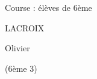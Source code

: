 \documentclass[a4paper,11pt,fleqn]{article}
\begin{document}
\begin{block}
\begin{minipage}{0.48\linewidth}
\vspace{0.5cm}

	Course : élèves de 6ème
\end{minipage}
\begin{minipage}{0.5\linewidth}
{}\hfill {}
{}\hfill {}

\bigskip

\begin{center}
	LACROIX
	
	Olivier
	
	(6ème 3)
\end{center}
\end{minipage}


\end{block}

\vfill


\vfill
\end{document}
